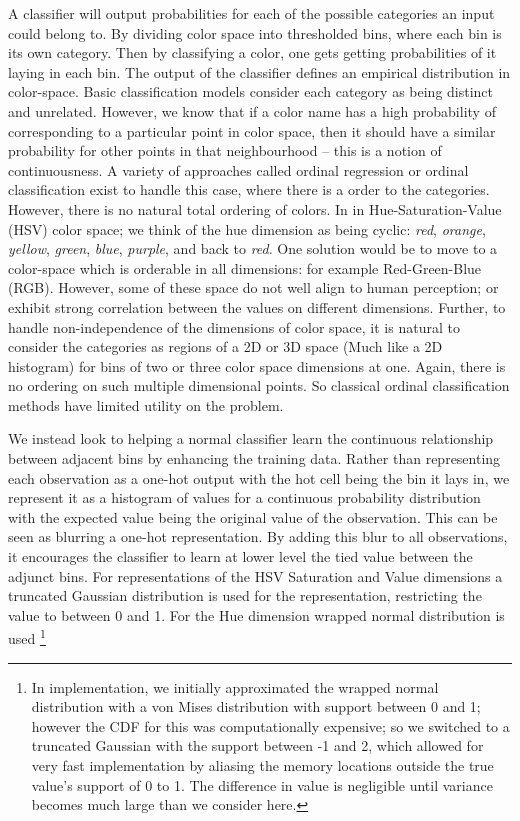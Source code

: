 \documentclass[]{article}
\begin{document}
A classifier will output probabilities for each of the possible categories an input could belong to.
By dividing color space into thresholded bins, where each bin is its own category.
Then by classifying a color, one gets getting probabilities of it laying in each bin. The output of the classifier defines an empirical distribution in color-space.
Basic classification models consider each category as being distinct and unrelated.
However, we know that if a color name has a high probability of corresponding to a particular point in color space, then it should have a similar probability for other points in that neighbourhood -- this is a notion of continuousness.
A variety of approaches called ordinal regression or ordinal classification exist to handle this case, where there is a order to the categories.
However, there is no natural total ordering of colors.
In in Hue-Saturation-Value (HSV) color space; we think of the hue dimension as being cyclic: \emph{red}, \emph{orange}, \emph{yellow}, \emph{green}, \emph{blue}, \emph{purple}, and back to \emph{red}.
One solution would be to move to a color-space which is orderable in all dimensions: for example Red-Green-Blue (RGB).
However, some of these space do not well align to human perception; or exhibit strong correlation between the values on different dimensions.
Further, to handle non-independence of the dimensions of color space, it is natural to consider the categories as regions of a 2D or 3D space (Much like a 2D histogram) for bins of two or three color space dimensions at one.
Again, there is no ordering on such multiple dimensional points.
So classical ordinal classification methods have limited utility on the problem.

We instead look to helping a normal classifier learn the continuous relationship between adjacent bins by enhancing the training data.
Rather than representing each observation as a one-hot output with the hot cell being the bin it lays in, we represent it as a histogram of values for a continuous probability distribution with the expected value being the original value of the observation.
This can be seen as blurring a one-hot representation.
By adding this blur to all observations, it encourages the classifier to learn at lower level the tied value between the adjunct bins.
For representations of the HSV Saturation and Value dimensions a truncated Gaussian distribution is used for the representation, restricting the value to between 0 and 1.
For the Hue dimension wrapped normal distribution is used \footnote{In implementation, we initially approximated the wrapped normal distribution with a von Mises distribution with support between 0 and 1; however the CDF for this was computationally expensive; so we switched to a truncated Gaussian with the support between -1 and 2, which allowed for very fast implementation by aliasing the memory locations outside the true value's support of 0 to 1. The difference in value is negligible until variance becomes much large than we consider here.}
\end{document}
